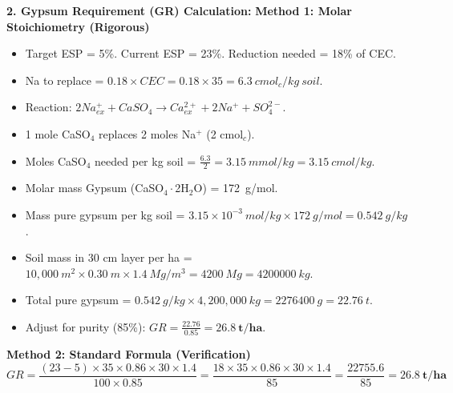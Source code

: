 \documentclass[11pt]{article}
\begin{document}
\begin{exoresolu}
\noindent\textbf{2. Gypsum Requirement (GR) Calculation:}
\textbf{Method 1: Molar Stoichiometry (Rigorous)}
\begin{itemize}
\item Target ESP = 5\%. Current ESP = 23\%. Reduction needed = 18\% of CEC.
\item Na to replace = $0.18 \times CEC = 0.18 \times 35 = \SI{6.3}{cmol_{c}/kg\ soil}$.
\item Reaction: $2Na^+_{ex} + CaSO_4 \rightarrow Ca^{2+}_{ex} + 2Na^+ + SO_4^{2-}$.
\item 1 mole CaSO$_4$ replaces 2 moles Na$^+$ (2 cmol$_c$).
\item Moles CaSO$_4$ needed per kg soil = $\frac{6.3}{2} = \SI{3.15}{mmol/kg} = \SI{3.15}{cmol/kg}$.
\item Molar mass Gypsum (CaSO$_4\cdot$2H$_2$O) = \SI{172}{g/mol}.
\item Mass pure gypsum per kg soil = $3.15 \times 10^{-3}\ mol/kg \times 172\ g/mol = \SI{0.542}{g/kg}$.
\item Soil mass in 30 cm layer per ha = $10,000\ m^2 \times 0.30\ m \times 1.4\ Mg/m^3 = \SI{4200}{Mg} = \SI{4200000}{kg}$.
\item Total pure gypsum = $0.542\ g/kg \times 4,200,000\ kg = \SI{2276400}{g} = \SI{22.76}{t}$.
\item Adjust for purity (85\%): $GR = \frac{22.76}{0.85} = \mathbf{26.8\ t/ha}$.
\end{itemize}

\textbf{Method 2: Standard Formula (Verification)}
\[
GR = \frac{(23 - 5) \times 35 \times 0.86 \times 30 \times 1.4}{100 \times 0.85} = \frac{18 \times 35 \times 0.86 \times 30 \times 1.4}{85} = \frac{22755.6}{85} = \mathbf{26.8\ t/ha}
\]


\end{exoresolu}
\end{document}
